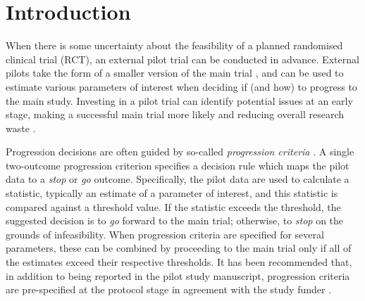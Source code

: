 \documentclass{bmcart}
\begin{document}


\section{Introduction}\label{sec:introduction}

When there is some uncertainty about the feasibility of a planned randomised clinical trial (RCT), an external pilot trial can be conducted in advance. External pilots take the form of a smaller version of the main trial \cite{Eldridge2016}, and can be used to estimate various parameters of interest when deciding if (and how) to progress to the main study. Investing in a pilot trial can identify potential issues at an early stage, making a successful main trial more likely and reducing overall research waste \cite{Morgan2018}.

Progression decisions are often guided by so-called \emph{progression criteria} \cite{Eldridge2016a}. A single two-outcome progression criterion specifies a decision rule which maps the pilot data to a \emph{stop} or \emph{go} outcome. Specifically, the pilot data are used to calculate a statistic, typically an estimate of a parameter of interest, and this statistic is compared against a threshold value. If the statistic exceeds the threshold, the suggested decision is to \emph{go} forward to the main trial; otherwise, to \emph{stop} on the grounds of infeasibility. When progression criteria are specified for several parameters, these can be combined by proceeding to the main trial only if all of the estimates exceed their respective thresholds. It has been recommended that, in addition to being reported in the pilot study manuscript, progression criteria are pre-specified at the protocol stage in agreement with the study funder \cite{NIHR2017, Mbuagbaw2019}.
\end{document}
